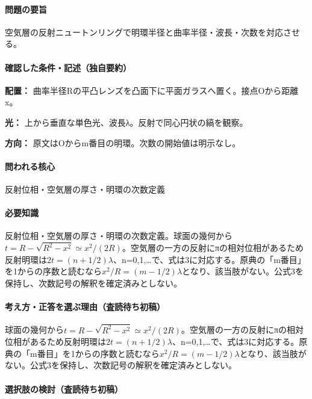 \paragraph{問題の要旨} 空気層の反射ニュートンリングで明環半径と曲率半径・波長・次数を対応させる。

\paragraph{確認した条件・記述（独自要約）}\mbox{}\par

\noindent\textbf{配置：} 曲率半径Rの平凸レンズを凸面下に平面ガラスへ置く。接点Oから距離x。\par

\noindent\textbf{光：} 上から垂直な単色光、波長λ。反射で同心円状の縞を観察。\par

\noindent\textbf{方向：} 原文はOからm番目の明環。次数の開始値は明示なし。\par

\paragraph{問われる核心} 反射位相・空気層の厚さ・明環の次数定義

\paragraph{必要知識} 反射位相・空気層の厚さ・明環の次数定義。球面の幾何から\(t=R-\sqrt{R^2-x^2}\simeq x^2/(2R)\)。空気層の一方の反射にπの相対位相があるため反射明環は\(2t=(n+1/2)\lambda\)、n=\allowbreak{}0,1,…で、式は3に対応する。原典の「m番目」を1からの序数と読むなら\(x^2/R=(m-1/2)\lambda\)となり、該当肢がない。公式3を保持し、次数記号の解釈を確定済みとしない。

\paragraph{考え方・正答を選ぶ理由（査読待ち初稿）} 球面の幾何から\(t=R-\sqrt{R^2-x^2}\simeq x^2/(2R)\)。空気層の一方の反射にπの相対位相があるため反射明環は\(2t=(n+1/2)\lambda\)、n=\allowbreak{}0,1,…で、式は3に対応する。原典の「m番目」を1からの序数と読むなら\(x^2/R=(m-1/2)\lambda\)となり、該当肢がない。公式3を保持し、次数記号の解釈を確定済みとしない。

\paragraph{選択肢の検討（査読待ち初稿）}\mbox{}\par

